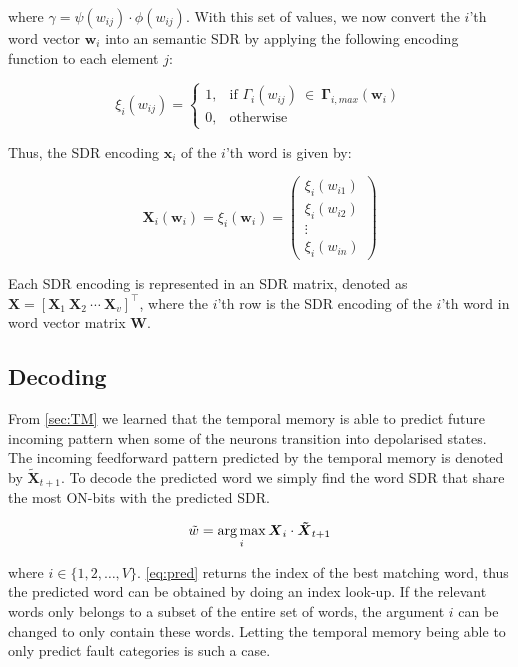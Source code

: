 where $\gamma = \psi(w_{ij}) \cdot \phi(w_{ij})$. With this set of values, we now convert the $i$'th word vector $\boldsymbol{w}_{i}$ into an semantic SDR by applying the following encoding function to each element $j$:


\begin{equation}
    \xi_i(w_{ij}) = 
        \begin{cases}
            1,&\text{if } \Gamma_{i}(w_{ij})\ \in\ \boldsymbol{\Gamma}_{i,max}(\boldsymbol{w}_{i})\\
            0,&\text{otherwise}
        \end{cases}
\end{equation}


Thus, the SDR encoding $\boldsymbol{x}_{i}$ of the $i$'th word is given by:

\begin{equation}
    \boldsymbol{X}_{i}(\boldsymbol{w}_{i}) = \xi_i(\boldsymbol{w}_{i}) = \begin{pmatrix}\xi_i(w_{i1})\\\xi_i(w_{i2})\\\vdots\\\xi_i(w_{in})\end{pmatrix}
    \label{eq:encode}
\end{equation}

Each SDR encoding is represented in an SDR matrix, denoted as $\boldsymbol{X}=[ \boldsymbol{X}_{1}\ \boldsymbol{X}_{2}\ \cdots\ \boldsymbol{X}_{v}]^{\top}$, where the $i$'th row is the SDR encoding of the $i$'th word in word vector matrix $\boldsymbol{W}$.


\subsection{Decoding}
From \autoref{sec:TM} we learned that the temporal memory is able to predict future incoming pattern when some of the neurons transition into depolarised states. The incoming feedforward pattern predicted by the temporal memory is denoted by $\boldsymbol{\tilde{X}}_{t+1}$. To decode the predicted word we simply find the word SDR that share the most ON-bits with the predicted SDR.

\begin{equation}
    \tilde{w} = \operatorname*{arg\,max}\limits_{i} \boldsymbol{X}_{i} \cdot \boldsymbol{\tilde{X}}_{t+1}
    \label{eq:pred}
\end{equation}


\noindent where $i \in \{1, 2, \hdots, V\}$. \autoref{eq:pred} returns the index of the best matching word, thus the predicted word can be obtained by doing an index look-up. If the relevant words only belongs to a subset of the entire set of words, the argument $i$ can be changed to only contain these words. Letting the temporal memory being able to only predict fault categories is such a case.
